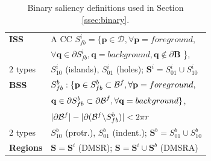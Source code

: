 \documentclass{article}
\def\B{{\mathbf B}}
\def\mcD{{\mathcal{D}}}
\def\p{{\mathbf p}}
\def\q{{\mathbf q}}
\def\S{{\mathbf S}}
\begin{document}
\begin{table}[hbt]
\begin{minipage}[b]{0.99\linewidth}\begin{tabular}{|l l|}
\hline
{\bf ISS} & A CC $S^i_{fb} = \{\p \in \mcD, \forall \p=foreground,$\\&$\forall \q \in \partial S^i_{fb}, \q=background, \q \notin \partial \B $ \},\\
$2$ types & $S^i_{10}$ (islands), $S^i_{01}$  (holes); $\S^i = S_{01}^i \cup S_{10}^i$\\
{\bf BSS} &  $S_{fb}^b: \{\p \in S_{fb}^b \subset{\cal B}^f, \forall \p = foreground,$\\&$ \q \in \partial S_{fb}^b \subset {\partial \cal B}^f,\forall \q = background \}$, \\
& $|\partial {\cal B}^f| - |\partial ({\cal B}^f \backslash S_{fb}^b)| < 2 \pi r$\\
$2$ types & $S^b_{10}$ (protr.), $S^b_{01}$ (indent.); $\S^b = S_{01}^b \cup S_{10}^b$\\
{\bf Regions} &  $\S = \S^i$ (DMSR); $\S = \S^i \cup \S^b$ (DMSRA)  \\
\hline
\end{tabular}
\hfill
\centering
\caption{Binary saliency definitions used in Section \ref{ssec:binary}.}\label{table:binary_sal}
\end{minipage}
\vspace*{-0.4cm}
\end{table}
\end{document}
